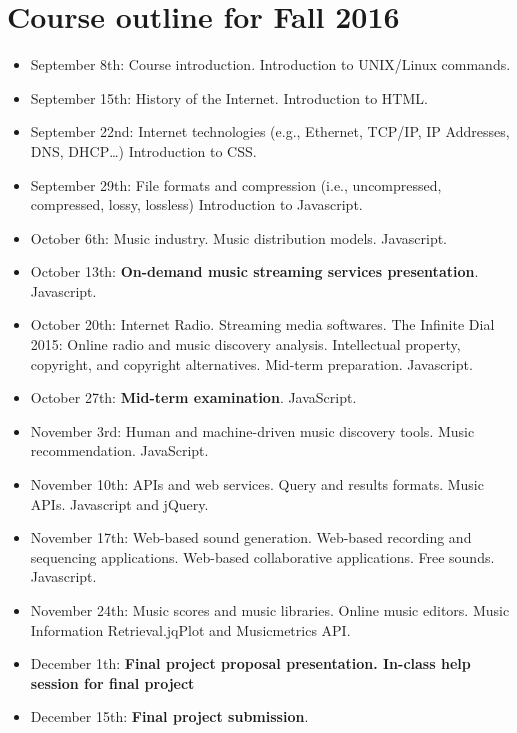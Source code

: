 \documentclass[11pt]{amsart}
\begin{document}
\section{Course outline for Fall 2016}
\begin{itemize}
\item September 8th: Course introduction. Introduction to UNIX/Linux commands. 
\item September 15th: History of the Internet. Introduction to HTML.\@
\item September 22nd: Internet technologies (e.g., Ethernet, TCP/IP, IP Addresses, DNS, DHCP\ldots) Introduction to CSS.\@
\item September 29th: File formats and compression (i.e., uncompressed, compressed, lossy, lossless) Introduction to Javascript.
\item October 6th: Music industry. Music distribution models. Javascript.
\item October 13th: \textbf{On-demand music streaming services presentation}. Javascript.
\item October 20th: Internet Radio. Streaming media softwares. The Infinite Dial 2015: Online radio and music discovery analysis. Intellectual property, copyright, and copyright alternatives. Mid-term preparation. Javascript.
\item October 27th: \textbf{Mid-term examination}. JavaScript.
\item November 3rd: Human and machine-driven music discovery tools. Music recommendation. JavaScript.
\item November 10th: APIs and web services. Query and results formats. Music APIs. Javascript and jQuery.
\item November 17th: Web-based sound generation. Web-based recording and sequencing applications. Web-based collaborative applications. Free sounds. Javascript.


\item November 24th: Music scores and music libraries. Online music editors. Music Information Retrieval.\@ jqPlot and Musicmetrics API.\@

\item December 1th: \textbf{Final project proposal presentation. In-class help session for final project}
\item December 15th: \textbf{Final project submission}.
\end{itemize}
\end{document}
